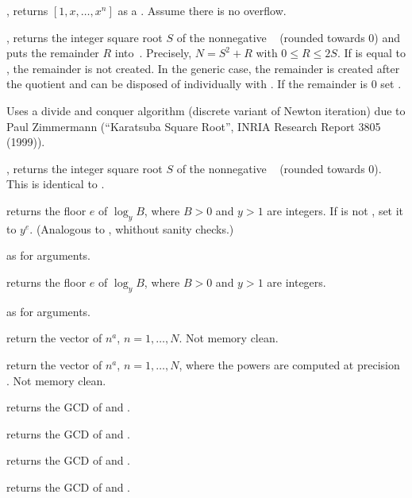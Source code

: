 , returns $[1,x,\ldots,x^n]$ as a
. Assume there is no overflow.

, returns the integer square root $S$ of
the nonnegative ~ (rounded towards 0) and puts the remainder
$R$ into~. Precisely, $N = S^2 + R$ with $0\leq R \leq 2S$. If
 is equal to , the remainder is not created. In the generic
case, the remainder is created after the quotient and can be disposed of
individually with . If the remainder is $0$ set .

Uses a divide and conquer algorithm (discrete variant of Newton iteration)
due to Paul Zimmermann (``Karatsuba Square Root'', INRIA Research Report 3805
(1999)).

, returns the integer square root $S$ of
the nonnegative ~ (rounded towards 0). This is identical
to .

returns the floor $e$ of $\log_y B$, where $B > 0$ and $y > 1$ are integers.
If  is not , set it to $y^e$. (Analogous to ,
whithout sanity checks.)

 as  for
 arguments.

 returns the floor $e$ of $\log_y B$, where
$B > 0$ and $y > 1$ are integers.

 as  for
 arguments.

 return the vector of $n^a$, $n = 1,
\dots, N$. Not memory clean.

 return the vector of $n^a$, $n
= 1, \dots, N$, where the powers are computed at precision . Not
memory clean.


 returns the GCD of  and .

 returns the GCD of  and .

 returns the GCD of  and .

 returns the GCD of  and .

